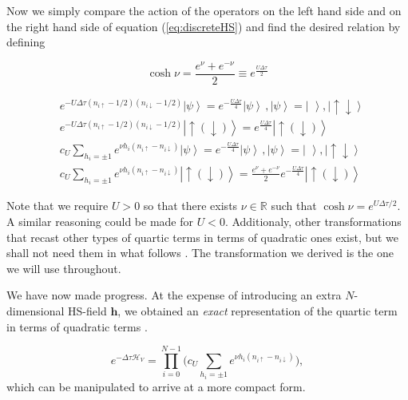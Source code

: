 Now we simply compare the action of the operators on the left hand side and on the right hand side of equation (\ref{eq:discreteHS}) and find the desired relation by defining

\begin{equation}
\cosh \nu =  \frac{e^\nu + e^{-\nu} }{2} \equiv e^{\frac{U\Delta \tau}{2}}
\end{equation}

\begin{equation}
\begin{split}
&e^{-U \Delta\tau (n_{i\uparrow} - 1/2 ) (n_{i\downarrow} - 1/2 )} \left| \psi \right\rangle = e^{-\frac{U\Delta \tau}{4}} \left| \psi \right\rangle \, , \left| \psi \right\rangle = \left| \, \, \right\rangle, \left| \uparrow \downarrow \right\rangle \\
&e^{-U \Delta\tau (n_{i\uparrow} - 1/2 ) (n_{i\downarrow} - 1/2 )} \left| \uparrow (\downarrow) \right\rangle = e^{\frac{U\Delta \tau}{4}} \left| \uparrow (\downarrow) \right\rangle \\
&c_U \sum_{h_i = \pm 1} e^{\nu h_i (n_{i\uparrow} - n_{i\downarrow} )} \left| \psi \right\rangle = e^{-\frac{U\Delta \tau}{4}} \left| \psi \right\rangle \, , \left| \psi \right\rangle = \left| \, \, \right\rangle, \left| \uparrow \downarrow \right\rangle \\
&c_U \sum_{h_i = \pm 1} e^{\nu h_i (n_{i\uparrow} - n_{i\downarrow} )} \left| \uparrow (\downarrow) \right\rangle= \frac{e^\nu + e^{-\nu}}{2} e^{-\frac{U\Delta \tau}{4}}  \left| \uparrow (\downarrow) \right\rangle
\end{split}
\end{equation}

Note that we require $U > 0$ so that there exists $\nu \in \mathbb{R}$ such that $\cosh \nu = e^{U\Delta \tau / 2}$. A similar reasoning could be made for $U < 0$. Additionaly, other transformations that recast other types of quartic terms in terms of quadratic ones exist, but we shall not need them in what follows \cite{hirsch_monte_1983}. The transformation we derived is the one we will use throughout.

We have now made progress. At the expense of introducing an extra $N$-dimensional HS-field $\bm h$, we obtained an \emph{exact} representation of the quartic term in terms of quadratic terms \cite{hou_numerical_2009}.

\begin{equation} 
 e^{-\Delta\tau \mathcal{H}_V} = \prod_{i=0}^{N-1} \bigg( c_U \sum_{h_i = \pm 1} e^{\nu h_i ( n_{i\uparrow} - n_{i\downarrow} )} \bigg),
\end{equation} 
which can be manipulated to arrive at a more compact form.

